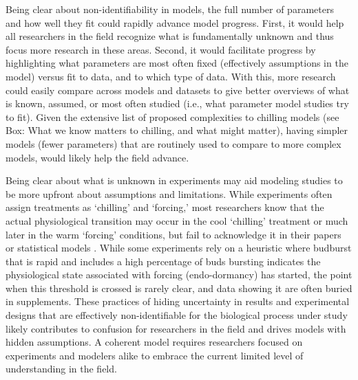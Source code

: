\documentclass[11pt]{article}
\begin{document}
Being clear about non-identifiability in models, the full number of parameters and how well they fit could rapidly advance model progress. First, it would help all researchers in the field recognize what is fundamentally unknown and thus focus more research in these areas. Second, it would facilitate progress by highlighting what parameters are most often fixed (effectively assumptions in the model) %
versus fit to data, and to which type of data. With this, more research could easily compare across models and datasets to give better overviews of what is known, assumed, or most often studied (i.e., what parameter model studies try to fit). Given the extensive list of proposed complexities to chilling models (see Box: What we know matters to chilling, and what might matter), having simpler models (fewer parameters) that are routinely used to compare to more complex models, would likely help the field advance. %

Being clear about what is unknown in experiments may aid modeling studies to be more upfront about assumptions and limitations. While experiments often assign treatments as `chilling' and `forcing,' most researchers know that the actual physiological transition may occur in the cool `chilling' treatment or much later in the warm `forcing' conditions, but fail to acknowledge it in their papers or statistical models \citep{ospreebbms,ospreenph2023}. While some experiments rely on a heuristic where budburst that is rapid and includes a high percentage of buds bursting indicates the physiological state associated with forcing (endo-dormancy) has started, the point when this threshold is crossed is rarely clear, and data showing it are often buried in supplements. These practices of hiding uncertainty in results and experimental designs that are effectively non-identifiable for the biological process under study likely contributes to confusion for researchers in the field and drives models with hidden assumptions. A coherent model requires researchers focused on experiments and modelers alike to embrace the current limited level of understanding in the field. %
\end{document}
